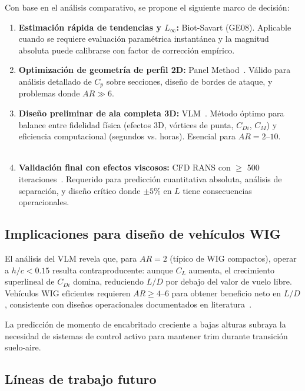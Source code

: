 \documentclass[twocolumn]{article}
\begin{document}
Con base en el análisis comparativo, se propone el siguiente marco de decisión:

\begin{enumerate}
    \item \textbf{Estimación rápida de tendencias y $L_\infty$:} Biot-Savart (GE08). Aplicable cuando se requiere evaluación paramétrica instantánea y la magnitud absoluta puede calibrarse con factor de corrección empírico.
    
    \item \textbf{Optimización de geometría de perfil 2D:} Panel Method~\cite{hess1967}. Válido para análisis detallado de $C_p$ sobre secciones, diseño de bordes de ataque, y problemas donde $AR \gg 6$.
    
    \item \textbf{Diseño preliminar de ala completa 3D:} VLM~\cite{katz2001}. Método óptimo para balance entre fidelidad física (efectos 3D, vórtices de punta, $C_{Di}$, $C_M$) y eficiencia computacional (segundos vs. horas). Esencial para $AR = 2$--$10$.
    
    \item \textbf{Validación final con efectos viscosos:} CFD RANS con $\geq$ 500 iteraciones~\cite{versteeg2007}. Requerido para predicción cuantitativa absoluta, análisis de separación, y diseño crítico donde $\pm 5\%$ en $L$ tiene consecuencias operacionales.
\end{enumerate}

\subsection{Implicaciones para diseño de vehículos WIG}

El análisis del VLM revela que, para $AR = 2$ (típico de WIG compactos), operar a $h/c < 0.15$ resulta contraproducente: aunque $C_L$ aumenta, el crecimiento superlineal de $C_{Di}$ domina, reduciendo $L/D$ por debajo del valor de vuelo libre. Vehículos WIG eficientes requieren $AR \geq 4$--$6$ para obtener beneficio neto en $L/D$, consistente con diseños operacionales documentados en literatura~\cite{rozhdestvensky2006}.

La predicción de momento de encabritado creciente a bajas alturas subraya la necesidad de sistemas de control activo para mantener trim durante transición suelo-aire.

\subsection{Líneas de trabajo futuro}
\end{document}

